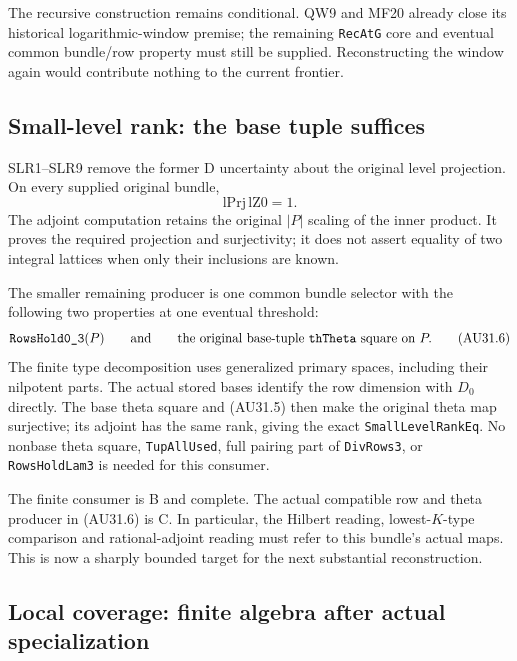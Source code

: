 The recursive construction remains conditional. QW9 and MF20
already close its historical logarithmic-window premise; the
remaining \texttt{RecAtG} core and eventual common bundle/row
property must still be supplied. Reconstructing the window again
would contribute nothing to the current frontier.

\subsection{Small-level rank: the base tuple suffices}

SLR1--SLR9 remove the former D uncertainty about the original
level projection. On every supplied original bundle,
\[
                     \mathrm{lPrj}\,\mathrm{lZ0}=1.
                                                               \tag{AU31.5}
\]
The adjoint computation retains the original $|P|$ scaling of the
inner product. It proves the required projection and surjectivity;
it does not assert equality of two integral lattices when only
their inclusions are known.

The smaller remaining producer is one common bundle selector with
the following two properties at one eventual threshold:
\[
\texttt{RowsHold0\_3}(P)
\qquad\hbox{and}\qquad
\text{the original base-tuple }\texttt{thTheta}\text{ square on }P.
                                                               \tag{AU31.6}
\]
The finite type decomposition uses generalized primary spaces,
including their nilpotent parts. The actual stored bases identify
the row dimension with $D_0$ directly. The base theta square and
(AU31.5) then make the original theta map surjective; its adjoint
has the same rank, giving the exact \texttt{SmallLevelRankEq}.
No nonbase theta square, \texttt{TupAllUsed}, full pairing part of
\texttt{DivRows3}, or \texttt{RowsHoldLam3} is needed for this
consumer.

The finite consumer is B and complete. The actual compatible
row and theta producer in (AU31.6) is C. In particular, the Hilbert
reading, lowest-$K$-type comparison and rational-adjoint reading
must refer to this bundle's actual maps. This is now a sharply
bounded target for the next substantial reconstruction.

\subsection{Local coverage: finite algebra after actual specialization}

